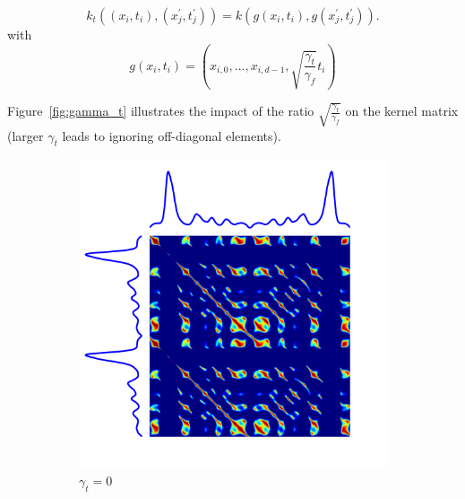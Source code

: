 \begin{equation}
    k_t((x_i, t_i), (x^\prime_j, t^\prime_j)) = k(g(x_i, t_i), g(x^\prime_j, t^\prime_j)).
\end{equation}
with
\begin{equation}
g(x_i, t_i) = \left( x_{i,0}, \dots , x_{i, d-1},
                            \sqrt{\frac{\gamma_t}{\gamma_f}} t_i \right)
\end{equation}

Figure~\ref{fig:gamma_t} illustrates the impact of the ratio
$\sqrt{\frac{\gamma_t}{\gamma_f}}$ on the kernel matrix (larger $\gamma_t$
leads to ignoring off-diagonal elements).

\begin{figure}[t]
    \begin{subfigure}[b]{0.3\textwidth}
         \centering
         \includegraphics[width=\textwidth]{fig/gram_gammat0}
         \caption{$\gamma_t = 0$}
     \end{subfigure}
     \hfill
     \begin{subfigure}[b]{0.3\textwidth}
          \centering

\end{subfigure}
\end{figure}
